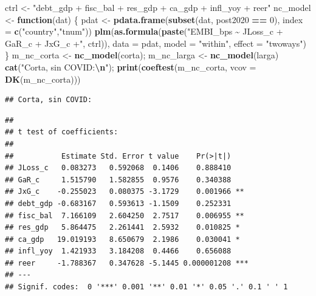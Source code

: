 \documentclass[
]{article}
\newenvironment{Shaded}{\begin{snugshade}}{\end{snugshade}}
\newcommand{\AttributeTok}[1]{\textcolor[rgb]{0.13,0.29,0.53}{#1}}
\newcommand{\ControlFlowTok}[1]{\textcolor[rgb]{0.13,0.29,0.53}{\textbf{#1}}}
\newcommand{\DecValTok}[1]{\textcolor[rgb]{0.00,0.00,0.81}{#1}}
\newcommand{\FunctionTok}[1]{\textcolor[rgb]{0.13,0.29,0.53}{\textbf{#1}}}
\newcommand{\NormalTok}[1]{#1}
\newcommand{\OtherTok}[1]{\textcolor[rgb]{0.56,0.35,0.01}{#1}}
\newcommand{\SpecialCharTok}[1]{\textcolor[rgb]{0.81,0.36,0.00}{\textbf{#1}}}
\newcommand{\StringTok}[1]{\textcolor[rgb]{0.31,0.60,0.02}{#1}}
\begin{document}
\begin{Shaded}
\begin{Highlighting}[]
\NormalTok{ctrl }\OtherTok{\textless{}{-}} \StringTok{"debt\_gdp + fisc\_bal + res\_gdp + ca\_gdp + infl\_yoy + reer"}
\NormalTok{nc\_model }\OtherTok{\textless{}{-}} \ControlFlowTok{function}\NormalTok{(dat) \{}
\NormalTok{  pdat }\OtherTok{\textless{}{-}} \FunctionTok{pdata.frame}\NormalTok{(}\FunctionTok{subset}\NormalTok{(dat, post2020 }\SpecialCharTok{==} \DecValTok{0}\NormalTok{), }\AttributeTok{index =} \FunctionTok{c}\NormalTok{(}\StringTok{"country"}\NormalTok{,}\StringTok{"tnum"}\NormalTok{))}
  \FunctionTok{plm}\NormalTok{(}\FunctionTok{as.formula}\NormalTok{(}\FunctionTok{paste}\NormalTok{(}\StringTok{"EMBI\_bps \textasciitilde{} JLoss\_c + GaR\_c + JxG\_c +"}\NormalTok{, ctrl)),}
      \AttributeTok{data =}\NormalTok{ pdat, }\AttributeTok{model =} \StringTok{"within"}\NormalTok{, }\AttributeTok{effect =} \StringTok{"twoways"}\NormalTok{)}
\NormalTok{\}}
\NormalTok{m\_nc\_corta }\OtherTok{\textless{}{-}} \FunctionTok{nc\_model}\NormalTok{(corta); m\_nc\_larga }\OtherTok{\textless{}{-}} \FunctionTok{nc\_model}\NormalTok{(larga)}
\FunctionTok{cat}\NormalTok{(}\StringTok{"Corta, sin COVID:}\SpecialCharTok{\textbackslash{}n}\StringTok{"}\NormalTok{); }\FunctionTok{print}\NormalTok{(}\FunctionTok{coeftest}\NormalTok{(m\_nc\_corta, }\AttributeTok{vcov =} \FunctionTok{DK}\NormalTok{(m\_nc\_corta)))}
\end{Highlighting}
\end{Shaded}

\begin{verbatim}
## Corta, sin COVID:
\end{verbatim}

\begin{verbatim}
## 
## t test of coefficients:
## 
##           Estimate Std. Error t value    Pr(>|t|)    
## JLoss_c   0.083273   0.592068  0.1406    0.888410    
## GaR_c     1.515790   1.582855  0.9576    0.340388    
## JxG_c    -0.255023   0.080375 -3.1729    0.001966 ** 
## debt_gdp -0.683167   0.593613 -1.1509    0.252331    
## fisc_bal  7.166109   2.604250  2.7517    0.006955 ** 
## res_gdp   5.864475   2.261441  2.5932    0.010825 *  
## ca_gdp   19.019193   8.650679  2.1986    0.030041 *  
## infl_yoy  1.421933   3.184208  0.4466    0.656088    
## reer     -1.788367   0.347628 -5.1445 0.000001208 ***
## ---
## Signif. codes:  0 '***' 0.001 '**' 0.01 '*' 0.05 '.' 0.1 ' ' 1
\end{verbatim}
\end{document}
